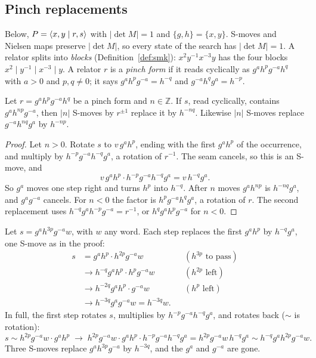 \subsection{Pinch replacements}\label{sec:pinch}

Below, $P=\langle x,y \mid r,s \rangle$ with $|\det M|=1$ and $\{g,h\}=\{x,y\}$. S-moves and Nielsen maps preserve $|\det M|$, so
every state of the search has $|\det M|=1$. A relator splits into \emph{blocks} (Definition~\ref{def:smk}):
$x^2y^{-1}x^{-3}y$ has the four blocks $x^2\mid y^{-1}\mid x^{-3}\mid y$. A relator $r$ is a \emph{pinch form} if it
reads cyclically as $g^ah^pg^{-a}h^q$ with $a>0$ and $p,q\neq0$; it says $g^ah^pg^{-a}=h^{-q}$ and
$g^{-a}h^qg^a=h^{-p}$.

\begin{lemma}\label{lem:pinch}
Let $r=g^ah^pg^{-a}h^q$ be a pinch form and $n\in\mathbb Z$. If $s$, read cyclically, contains $g^ah^{np}g^{-a}$, then
$|n|$ S-moves by $r^{\pm1}$ replace it by $h^{-nq}$. Likewise $|n|$ S-moves replace $g^{-a}h^{nq}g^a$ by $h^{-np}$.
\end{lemma}

\begin{proof}
Let $n>0$. Rotate $s$ to $v\,g^ah^p$, ending with the first $g^ah^p$ of the occurrence, and multiply by
$h^{-p}g^{-a}h^{-q}g^a$, a rotation of $r^{-1}$. The seam cancels, so this is an S-move, and
\[
v\,g^ah^p\cdot h^{-p}g^{-a}h^{-q}g^a=v\,h^{-q}g^a .
\]
So $g^a$ moves one step right and turns $h^p$ into $h^{-q}$. After $n$ moves $g^ah^{np}$ is $h^{-nq}g^a$, and
$g^ag^{-a}$ cancels. For $n<0$ the factor is $h^pg^{-a}h^qg^a$, a rotation of $r$. The second replacement uses
$h^{-q}g^ah^{-p}g^{-a}=r^{-1}$, or $h^qg^ah^pg^{-a}$ for $n<0$.
\end{proof}

\begin{example}\label{ex:replace}
Let $s=g^ah^{3p}g^{-a}w$, with $w$ any word. Each step replaces the first $g^ah^p$ by $h^{-q}g^a$, one S-move as in
the proof:
\begin{align*}
s&=g^ah^p\cdot h^{2p}g^{-a}w &&(h^{3p}\text{ to pass})\\
&\to h^{-q}g^ah^p\cdot h^{p}g^{-a}w &&(h^{2p}\text{ left})\\
&\to h^{-2q}g^ah^p\cdot g^{-a}w &&(h^{p}\text{ left})\\
&\to h^{-3q}g^ag^{-a}w=h^{-3q}w.
\end{align*}
In full, the first step rotates $s$, multiplies by $h^{-p}g^{-a}h^{-q}g^a$, and rotates back ($\sim$ is rotation):
\[
s\sim h^{2p}g^{-a}w\cdot g^ah^p\;\to\;h^{2p}g^{-a}w\cdot g^ah^p\cdot h^{-p}g^{-a}h^{-q}g^a=h^{2p}g^{-a}w\,h^{-q}g^a
\sim h^{-q}g^ah^{2p}g^{-a}w.
\]
Three S-moves replace $g^ah^{3p}g^{-a}$ by $h^{-3q}$, and the $g^a$ and $g^{-a}$ are gone.
\end{example}

